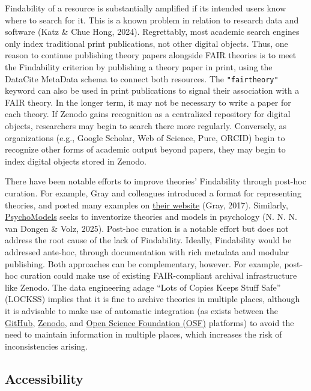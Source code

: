 \documentclass[man]{apa7}
\begin{document}
Findability of a resource is substantially amplified if its intended users know where to search for it.
This is a known problem in relation to research data and software (Katz \& Chue Hong, 2024).
Regrettably, most academic search engines only index traditional print publications, not other digital objects.
Thus, one reason to continue publishing theory papers alongside FAIR theories is to meet the Findability criterion by publishing a theory paper in print, using the DataCite MetaData schema to connect both resources.
The \texttt{"fairtheory"} keyword can also be used in print publications to signal their association with a FAIR theory.
In the longer term, it may not be necessary to write a paper for each theory.
If Zenodo gains recognition as a centralized repository for digital objects, researchers may begin to search there more regularly.
Conversely, as organizations (e.g., Google Scholar, Web of Science, Pure, ORCID) begin to recognize other forms of academic output beyond papers, they may begin to index digital objects stored in Zenodo.

There have been notable efforts to improve theories' Findability through post-hoc curation.
For example, Gray and colleagues introduced a format for representing theories,
and posted many examples on \href{https://www.theorymaps.org}{their website} (Gray, 2017).
Similarly, \href{http://psychomodels.org/}{PsychoModels} seeks to inventorize theories and models in psychology (N. N. N. van Dongen \& Volz, 2025).
Post-hoc curation is a notable effort but does not address the root cause of the lack of Findability.
Ideally, Findability would be addressed ante-hoc, through documentation with rich metadata and modular publishing.
Both approaches can be complementary, however.
For example, post-hoc curation could make use of existing FAIR-compliant archival infrastructure like Zenodo.
The data engineering adage ``Lots of Copies Keeps Stuff Safe'' (LOCKSS) implies that it is fine to archive theories in multiple places,
although it is advisable to make use of automatic integration (as exists between the \href{http://github.com/}{GitHub}, \href{https://zenodo.org}{Zenodo}, and \href{https://osf.io}{Open Science Foundation (OSF)} platforms)
to avoid the need to maintain information in multiple places, which increases the risk of inconsistencies arising.

\subsection{Accessibility}\label{accessibility}
\end{document}

